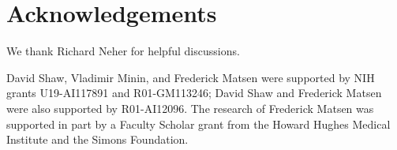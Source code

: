 \documentclass{article}
\newcommand{\beginsupplement}{%
        \setcounter{table}{0}
        \renewcommand{\thetable}{S\arabic{table}}%
        \setcounter{figure}{0}
        \renewcommand{\thefigure}{S\arabic{figure}}%
     }
\begin{document}
\section*{Acknowledgements}
We thank Richard Neher for helpful discussions.

David Shaw, Vladimir Minin, and Frederick Matsen were supported by NIH grants U19-AI117891 and R01-GM113246; David Shaw and Frederick Matsen were also supported by R01-AI12096.
The research of Frederick Matsen was supported in part by a Faculty Scholar grant from the Howard Hughes Medical Institute and the Simons Foundation.




\newpage
\beginsupplement


\end{document}
